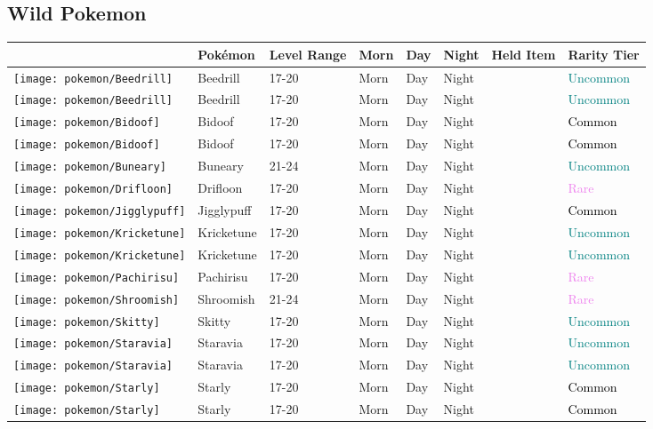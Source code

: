 \subsection{Wild Pokemon}%
\label{subsec:WildPokemon}%
\begin{longtable}{||l l l l l l l l||}%
\hline%
&Pokémon&Level Range&Morn&Day&Night&Held Item&Rarity Tier\\%
\hline%
\endhead%
\hline%
\texttt{[image: pokemon/Beedrill]}&Beedrill&17{-}20&Morn&Day&Night&&\textcolor{teal}{%
Uncommon%
}\\%
\hline%
\texttt{[image: pokemon/Beedrill]}&Beedrill&17{-}20&Morn&Day&Night&&\textcolor{teal}{%
Uncommon%
}\\%
\hline%
\texttt{[image: pokemon/Bidoof]}&Bidoof&17{-}20&Morn&Day&Night&&\textcolor{black}{%
Common%
}\\%
\hline%
\texttt{[image: pokemon/Bidoof]}&Bidoof&17{-}20&Morn&Day&Night&&\textcolor{black}{%
Common%
}\\%
\hline%
\texttt{[image: pokemon/Buneary]}&Buneary&21{-}24&Morn&Day&Night&&\textcolor{teal}{%
Uncommon%
}\\%
\hline%
\texttt{[image: pokemon/Drifloon]}&Drifloon&17{-}20&Morn&Day&Night&&\textcolor{violet}{%
Rare%
}\\%
\hline%
\texttt{[image: pokemon/Jigglypuff]}&Jigglypuff&17{-}20&Morn&Day&Night&&\textcolor{black}{%
Common%
}\\%
\hline%
\texttt{[image: pokemon/Kricketune]}&Kricketune&17{-}20&Morn&Day&Night&&\textcolor{teal}{%
Uncommon%
}\\%
\hline%
\texttt{[image: pokemon/Kricketune]}&Kricketune&17{-}20&Morn&Day&Night&&\textcolor{teal}{%
Uncommon%
}\\%
\hline%
\texttt{[image: pokemon/Pachirisu]}&Pachirisu&17{-}20&Morn&Day&Night&&\textcolor{violet}{%
Rare%
}\\%
\hline%
\texttt{[image: pokemon/Shroomish]}&Shroomish&21{-}24&Morn&Day&Night&&\textcolor{violet}{%
Rare%
}\\%
\hline%
\texttt{[image: pokemon/Skitty]}&Skitty&17{-}20&Morn&Day&Night&&\textcolor{teal}{%
Uncommon%
}\\%
\hline%
\texttt{[image: pokemon/Staravia]}&Staravia&17{-}20&Morn&Day&Night&&\textcolor{teal}{%
Uncommon%
}\\%
\hline%
\texttt{[image: pokemon/Staravia]}&Staravia&17{-}20&Morn&Day&Night&&\textcolor{teal}{%
Uncommon%
}\\%
\hline%
\texttt{[image: pokemon/Starly]}&Starly&17{-}20&Morn&Day&Night&&\textcolor{black}{%
Common%
}\\%
\hline%
\texttt{[image: pokemon/Starly]}&Starly&17{-}20&Morn&Day&Night&&\textcolor{black}{%
Common%
}\\%
\hline%
\end{longtable}%

